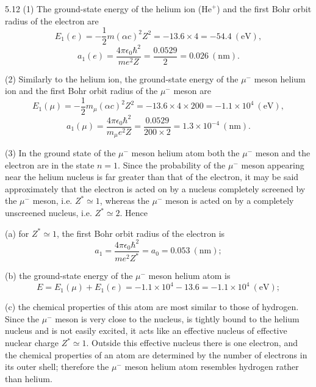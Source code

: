 \begin{solution}{5.12}
(1) The ground-state energy of the helium ion ($\mathrm{He}^+$) and the first Bohr orbit radius
of the electron are
\begin{equation*}
E_1(e)=-\frac{1}{2}m(\alpha c)^2Z^2=-13.6\times 4=-54.4\ (\mathrm{eV}),
\end{equation*}
\begin{equation*}
a_1(e)=\frac{4\pi\epsilon_0\hbar^2}{me^2Z}=\frac{0.0529}{2}=0.026\ (\mathrm{nm}).
\end{equation*}

(2) Similarly to the helium ion, the ground-state energy of the $\mu^-$ meson helium ion and the
first Bohr orbit radius of the $\mu^-$ meson are
\begin{equation*}
E_1(\mu)=-\frac{1}{2}m_\mu(\alpha c)^2Z^2=-13.6\times 4\times 200=-1.1\times10^4\ (\mathrm{eV}),
\end{equation*}
\begin{equation*}
a_1(\mu)=\frac{4\pi\epsilon_0\hbar^2}{m_\mu e^2Z}=\frac{0.0529}{200\times 2}=1.3\times10^{-4}\ (\mathrm{nm}).
\end{equation*}

(3) In the ground state of the $\mu^-$ meson helium atom both the $\mu^-$ meson and the electron
are in the state $n=1$. Since the probability of the $\mu^-$ meson appearing near the helium
nucleus is far greater than that of the electron, it may be said approximately that the electron
is acted on by a nucleus completely screened by the $\mu^-$ meson, i.e. $Z^*\simeq 1$, whereas the
$\mu^-$ meson is acted on by a completely unscreened nucleus, i.e. $Z^*\simeq 2$. Hence

(a) for $Z^*\simeq 1$, the first Bohr orbit radius of the electron is
\begin{equation*}
a_1=\frac{4\pi\epsilon_0\hbar^2}{me^2Z^*}=a_0=0.053\ (\mathrm{nm});
\end{equation*}

(b) the ground-state energy of the $\mu^-$ meson helium atom is
\begin{equation*}
E=E_1(\mu)+E_1(e)=-1.1\times10^4-13.6=-1.1\times10^4\ (\mathrm{eV});
\end{equation*}

(c) the chemical properties of this atom are most similar to those of hydrogen. Since the
$\mu^-$ meson is very close to the nucleus, is tightly bound to the helium nucleus and is not
easily excited, it acts like an effective nucleus of effective nuclear charge $Z^*\simeq 1$.
Outside this effective nucleus there is one electron, and the chemical properties of an atom are
determined by the number of electrons in its outer shell; therefore the $\mu^-$ meson helium
atom resembles hydrogen rather than helium.


\end{solution}
